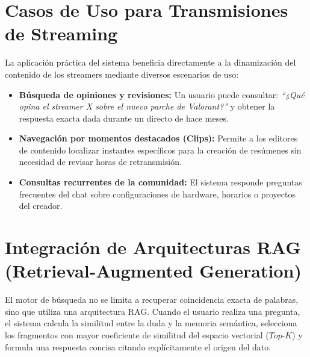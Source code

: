 \documentclass[12pt,a4paper]{article}
\begin{document}
\section{Casos de Uso para Transmisiones de Streaming}
La aplicación práctica del sistema beneficia directamente a la dinamización del contenido de los streamers mediante diversos escenarios de uso:
\begin{itemize}
  \item \textbf{Búsqueda de opiniones y revisiones:} Un usuario puede consultar: \emph{``¿Qué opina el streamer X sobre el nuevo parche de Valorant?''} y obtener la respuesta exacta dada durante un directo de hace meses.
  \item \textbf{Navegación por momentos destacados (Clips):} Permite a los editores de contenido localizar instantes específicos para la creación de resúmenes sin necesidad de revisar horas de retransmisión.
  \item \textbf{Consultas recurrentes de la comunidad:} El sistema responde preguntas frecuentes del chat sobre configuraciones de hardware, horarios o proyectos del creador.
\end{itemize}

\section{Integración de Arquitecturas RAG (Retrieval-Augmented Generation)}
El motor de búsqueda no se limita a recuperar coincidencia exacta de palabras, sino que utiliza una arquitectura RAG. Cuando el usuario realiza una pregunta, el sistema calcula la similitud entre la duda y la memoria semántica, selecciona los fragmentos con mayor coeficiente de similitud del espacio vectorial ($Top\text{-}K$) y formula una respuesta concisa citando explícitamente el origen del dato.
\end{document}
